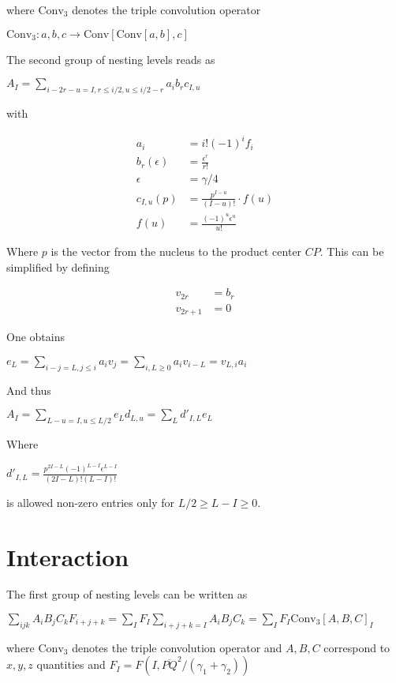 \documentclass[11pt]{article}
\begin{document}
where \(\text{Conv}_3\) denotes the triple convolution operator

\(\text{Conv}_3 : a,b,c \rightarrow \text{Conv}[\text{Conv}[a,b],c]\)

The second group of nesting levels reads as

\(A_I = \sum\limits_{i-2r-u = I, r \leq i /2, u \leq i/2 - r} a_i b_r c_{I, u}\)

with


\begin{align*}
a_i &= i! (-1)^if_i \\
b_r(\epsilon) &= \frac{\epsilon^r}{r!} \\
\epsilon &= \gamma / 4 \\
c_{I, u}(p) &= \frac{p^{I - u}}{(I - u)!} \cdot f(u) \\
f(u) &= \frac{(-1)^u \epsilon^u}{u!}
\end{align*}

Where \(p\) is the vector from the nucleus to the product center \(CP\). This can be simplified by defining

\begin{align}
v_{2r} &= b_r \\
v_{2r + 1} &= 0
\end{align}

One obtains

\(e_L = \sum\limits_{i - j = L, j \leq i} a_i v_j = \sum\limits_{i, L \geq 0}a_i v_{i - L} = v_{L, i} a_i\)

And thus

\(A_I = \sum\limits_{L - u = I, u \leq L / 2} e_L d_{L, u} = \sum\limits_{L} d'_{I, L} e_L\)

Where

\(d'_{I, L} = \frac{p^{2I - L} (-1)^{L - I} \epsilon^{L - I}}{(2I - L)!(L - I)!}\)

is allowed non-zero entries only for \(L/2 \geq L-I \geq 0\).

\section{Interaction}
\label{sec:org874893b}

The first group of nesting levels can be written as

\(\sum_{ijk} A_i B_j C_k F_{i+j+k} = \sum_I F_I \sum_{i+j+k=I} A_i B_j C_k = \sum_I F_I \text{Conv}_3[A,B,C]_I\)

where \(\text{Conv}_3\) denotes the triple convolution operator and \(A, B, C\) correspond to \(x, y, z\) quantities and \(F_I = F(I, \overline{PQ}^2 / (\gamma_1 + \gamma_2))\)
\end{document}
